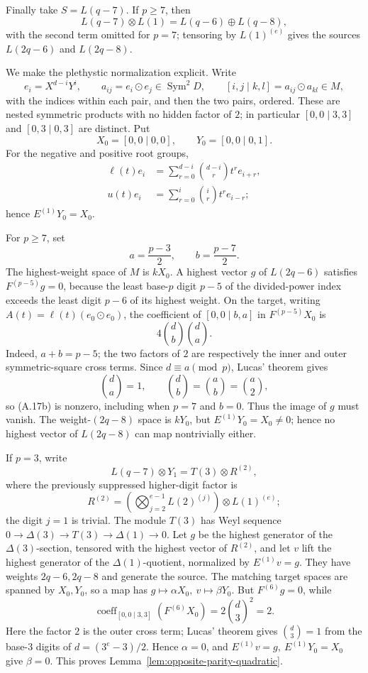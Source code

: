 \documentclass[11pt]{article}
\theoremstyle{definition}
\theoremstyle{remark}
\begin{document}
Finally take \(S=L(q-7)\).  If \(p\ge7\), then
\[
 L(q-7)\otimes L(1)=L(q-6)\oplus L(q-8),
\]
with the second term omitted for \(p=7\); tensoring by \(L(1)^{(e)}\)
gives the sources \(L(2q-6)\) and \(L(2q-8)\).

We make the plethystic normalization explicit.  Write
\[
 e_i=X^{d-i}Y^i,\qquad
 a_{ij}=e_i\odot e_j\in\operatorname{Sym}^2D,\qquad
 [i,j\mid k,l]=a_{ij}\odot a_{kl}\in M,
\]
with the indices within each pair, and then the two pairs, ordered.
These are nested symmetric products with no hidden factor of \(2\);
in particular \([0,0\mid3,3]\) and \([0,3\mid0,3]\) are distinct.  Put
\[
 X_0=[0,0\mid0,0],\qquad Y_0=[0,0\mid0,1].
\]
For the negative and positive root groups,
\[
\begin{aligned}
 \ell(t)e_i&=\sum_{r=0}^{d-i}\binom{d-i}{r}t^re_{i+r},\\
 u(t)e_i&=\sum_{r=0}^{i}\binom{i}{r}t^re_{i-r};
\end{aligned}                                           \tag{A.17a}
\]
hence \(E^{(1)}Y_0=X_0\).

For \(p\ge7\), set
\[
 a=\frac{p-3}{2},\qquad b=\frac{p-7}{2}.
\]
The highest-weight space of \(M\) is \(kX_0\).  A highest vector \(g\) of
\(L(2q-6)\) satisfies \(F^{(p-5)}g=0\), because the least base-\(p\)
digit \(p-5\) of the divided-power index exceeds the least digit \(p-6\)
of its highest weight.  On the target, writing
\(A(t)=\ell(t)(e_0\odot e_0)\), the coefficient of
\([0,0\mid b,a]\) in \(F^{(p-5)}X_0\) is
\[
 4\binom db\binom da.                                  \tag{A.17b}
\]
Indeed, \(a+b=p-5\); the two factors of \(2\) are respectively the
inner and outer symmetric-square cross terms.  Since \(d\equiv a\pmod p\),
Lucas' theorem gives
\[
 \binom da=1,\qquad \binom db=\binom ab=\binom a2,
\]
so (A.17b) is nonzero, including when \(p=7\) and \(b=0\).
Thus the image of \(g\) must vanish.  The weight-\((2q-8)\) space is
\(kY_0\), but \(E^{(1)}Y_0=X_0\ne0\); hence no highest vector of
\(L(2q-8)\) can map nontrivially either.

If \(p=3\), write
\[
 L(q-7)\otimes Y_1=T(3)\otimes R^{(2)},
\]
where the previously suppressed higher-digit factor is
\[
 R^{(2)}
 =\left(\bigotimes_{j=2}^{e-1}L(2)^{(j)}\right)
   \otimes L(1)^{(e)};
\]
the digit \(j=1\) is trivial.  The module \(T(3)\) has Weyl sequence
\(0\to\Delta(3)\to T(3)\to\Delta(1)\to0\).  Let \(g\) be the highest generator
of the \(\Delta(3)\)-section, tensored with the highest vector of
\(R^{(2)}\), and let \(v\) lift the highest generator of the
\(\Delta(1)\)-quotient, normalized by \(E^{(1)}v=g\).  They have weights
\(2q-6,2q-8\) and generate the source.  The matching target spaces are
spanned by \(X_0,Y_0\), so a map has
\(g\mapsto\alpha X_0,\ v\mapsto\beta Y_0\).  But \(F^{(6)}g=0\), while
\[
 \operatorname{coeff}_{[0,0\mid3,3]}(F^{(6)}X_0)
 =2\binom d3^2=2.                                      \tag{A.17c}
\]
Here the factor \(2\) is the outer cross term; Lucas' theorem gives
\(\binom d3=1\) from the base-\(3\) digits of
\(d=(3^e-3)/2\).  Hence \(\alpha=0\), and
\(E^{(1)}v=g,\ E^{(1)}Y_0=X_0\) give \(\beta=0\).
This proves Lemma~\ref{lem:opposite-parity-quadratic}.
\end{document}
